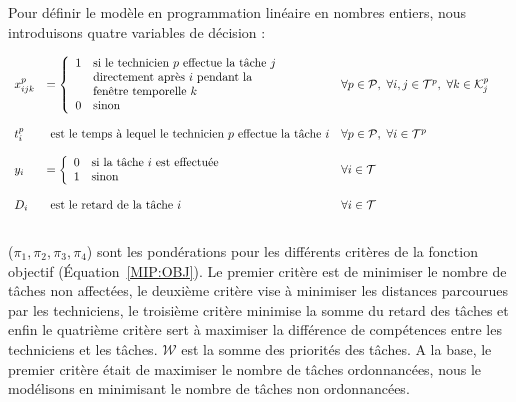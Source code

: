 Pour définir le modèle en programmation linéaire en nombres entiers, nous introduisons quatre variables de décision :

$$
\begin{array}{llll}
\xvar{i}{j}{k}{p} & =  \left\{ \begin{array}{ll}
1 & \text{si le technicien }p\text{ effectue la tâche }j ~~\\
 & \text{directement après }i\text{ pendant la }\\
 & \text{fenêtre temporelle } k\\
0 & \text{sinon}
\end{array}
\right.
 & 
  \forall p \in \tech,~\forall i,j \in \task^{p}, ~ \forall k \in \twTechTask{j}{p}
 &\\%
 ~&~ & ~&\\
 \tvar{i}{p} & \text{ est le temps à lequel le technicien }p\text{ effectue la tâche }i &
  \forall p \in \tech, ~
 \forall i \in \task^{p}
 &\\%
~&~ & ~&~\\
\yvar{i} & = 
\left\{
\begin{array}{ll}
0 & \text{si la tâche }i\text{ est effectuée}\\
1 & \text{sinon} 
\end{array}
\right. & \forall i \in \task & \\%
~&~ & ~& ~ \\
 \Dvar{i} & \text{ est le retard de la tâche }i &  \forall i \in \task &\\%
 ~&~ & ~&  ~\\
\end{array}
$$


($\pi_1,\pi_2,\pi_3,\pi_4$)  sont les pondérations pour les différents critères de la fonction objectif (Équation~\eqref{MIP:OBJ}). 
Le premier critère est de minimiser le nombre de tâches non affectées, le deuxième critère vise à minimiser les distances parcourues par les techniciens, le troisième critère minimise la somme du retard des tâches et enfin le quatrième critère sert à maximiser la différence de compétences entre les techniciens et les tâches.
$\mathcal{W}$ est la somme des priorités des tâches. A la base, le premier critère était de maximiser le nombre de tâches ordonnancées, nous le modélisons en minimisant le nombre de tâches non ordonnancées.\\


